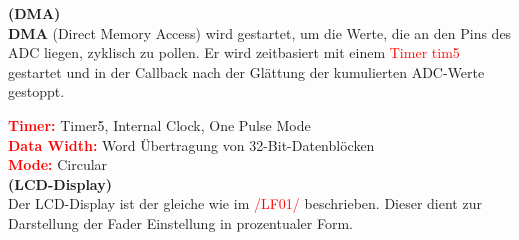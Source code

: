 \textbf{(DMA)}\\

\textbf{DMA} (Direct Memory Access) wird gestartet, um die Werte, die an den Pins des ADC liegen, zyklisch zu pollen. Er wird zeitbasiert mit einem \textcolor{red}{Timer tim5} gestartet und in der Callback nach der Glättung der kumulierten ADC-Werte gestoppt.

\textbf{\textcolor{red}{Timer:}} Timer5, Internal Clock, One Pulse Mode \\
\textbf{\textcolor{red}{Data Width:}} Word Übertragung von 32-Bit-Datenblöcken \\
\textbf{\textcolor{red}{Mode:}} Circular \\

\textbf{(LCD-Display)}\\

Der LCD-Display ist der gleiche wie im \textcolor{red}{/LF01/} beschrieben. Dieser dient zur Darstellung der Fader Einstellung in prozentualer Form.